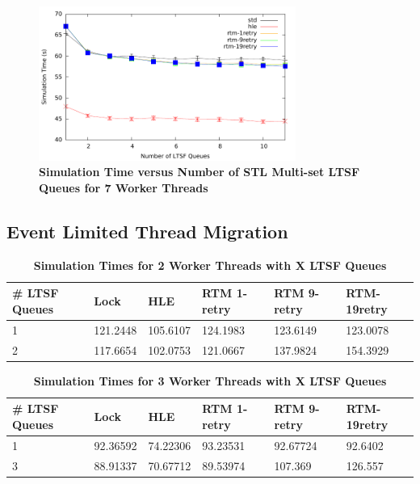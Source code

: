 \documentclass[11pt]{book}
\begin{document}
\begin{figure}[H]
    \centering
    \graphicspath{ {./figures/} }
    \includegraphics[width=0.75\textwidth,keepaspectratio]{contThrMig-hugeEpidemicSim-timeVSschedQs-multiset-7thread}
    \caption{\textbf{Simulation Time versus Number of STL Multi-set LTSF Queues
    for 7 Worker Threads}}
    \label{fig:contThrMig_timeVSschq_7threads}
\end{figure}



\subsection{Event Limited Thread Migration}

\begin{table}[H]
    \centering
    \begin{tabular}{l|p{2cm}|p{2cm}|p{2cm}|p{2cm}|p{2cm}}
        \textbf{\# LTSF Queues}&Lock &HLE &RTM 1-retry &RTM 9-retry &RTM-19retry \\
        \hline
        \midrule
            1 &121.2448  &105.6107 &124.1983  &123.6149 &123.0078 \\ 
            2 &117.6654  &102.0753 &121.0667  &137.9824 &154.3929 \\
    \end{tabular}
    \caption{\textbf{Simulation Times for 2 Worker Threads with X LTSF Queues}}
    \label{tab:xThrMig_2threadsXschq}
\end{table}

\begin{table}[H]
    \centering
    \begin{tabular}{l|p{2cm}|p{2cm}|p{2cm}|p{2cm}|p{2cm}}
        \textbf{\# LTSF Queues}&Lock &HLE &RTM 1-retry &RTM 9-retry &RTM-19retry \\
        \hline
        \midrule
            1 &92.36592  &74.22306 &93.23531  &92.67724 &92.6402 \\ 
            3 &88.91337  &70.67712 &89.53974  &107.369  &126.557 \\
    \end{tabular}
    \caption{\textbf{Simulation Times for 3 Worker Threads with X LTSF Queues}}
    \label{tab:xThrMig_3threadsXschq}
\end{table}
\end{document}
